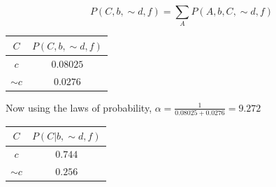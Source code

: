 \documentclass[12pt]{article}
\begin{document}
\begin{enumerate}
\[
	P(C, b, \sim d, f) = \sum_A P(A,b,C, \sim d,f)
\]

\begin{center}
	\begin{tabular}{|c|c|}
		\hline
		$C$ & $P(C,b,\sim d,f)$ \\
		\hline
		$c$ & $0.08025$ \\
		\hline
		$\sim c$ & $0.0276$ \\
		\hline
	\end{tabular}
\end{center}

Now using the laws of probability, $\alpha = \frac{1}{0.08025 + 0.0276} = 9.272$

\begin{center}
	\begin{tabular}{|c|c|}
		\hline
		$C$ & $P(C|b,\sim d,f)$ \\
		\hline
		$c$ & $0.744$ \\
		\hline
		$\sim c$ & $0.256$ \\
		\hline
	\end{tabular}
\end{center}

\end{enumerate}
\end{document}
